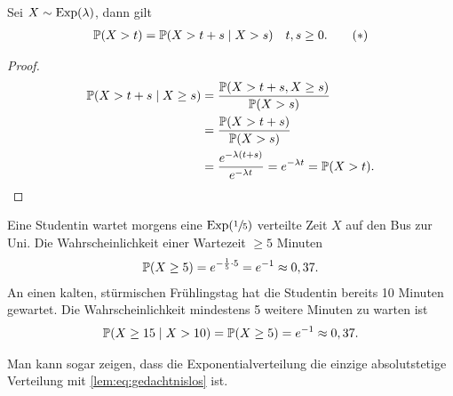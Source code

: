 \begin{lemma}
	Sei $X \sim \EXP(\lambda)$, dann gilt
	\begin{align*}
		\P(X>t) = \P(X > t+s \mid X > s) \quad t,s \ge 0. \tag{$\ast$}\label{lem:eq:gedachtnislos}
	\end{align*}
\end{lemma}
\begin{proof}
	\begin{align*}
		\P(X > t+s \mid X \ge s) &= \frac{\P(X> t+s, X \ge s)}{\P(X > s)}\\
		&= \frac{\P(X > t+s)}{\P(X > s)}\\
		&= \frac{e^{-\lambda(t+s)}}{e^{-\lambda t}} = e^{-\lambda t} = \P(X> t).
	\end{align*}
\end{proof}
\begin{example}
	Eine Studentin wartet morgens eine $\EXP(\sfrac{1}{5})$ verteilte Zeit $X$ auf den Bus zur Uni. Die Wahrscheinlichkeit einer Wartezeit $\ge 5$ Minuten
	\begin{align*}
	\P(X \ge 5) = e^{-\frac{1}{5}\cdot 5} = e^{-1} \approx 0,37.
	\end{align*}
	An einen kalten, stürmischen Frühlingstag hat die Studentin bereits 10 Minuten gewartet. Die Wahrscheinlichkeit mindestens 5 weitere Minuten zu warten ist
	\begin{align*}
	\P(X\ge 15 \mid X > 10) = \P(X\ge 5) = e^{-1} \approx 0,37.
	\end{align*}
\end{example}
\begin{*hint}
	Man kann sogar zeigen, dass die Exponentialverteilung die einzige absolutstetige Verteilung mit \eqref{lem:eq:gedachtnislos} ist.
\end{*hint}